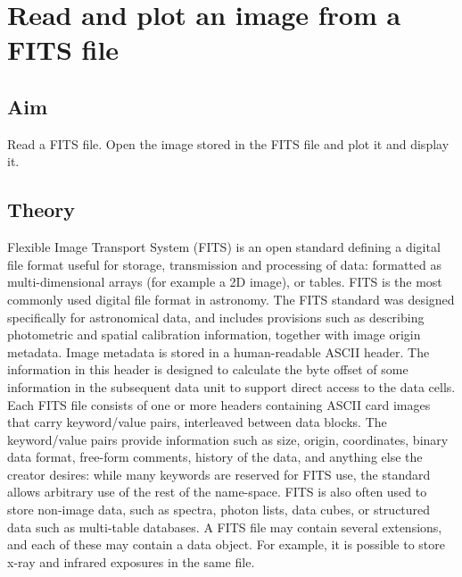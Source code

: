 \documentclass[letterpaper,11pt]{report}
\begin{document}
\chapter{Read and plot an image from a FITS file}

\section{Aim}
Read a FITS file. Open the image stored in the FITS file and plot it and display it.

\section{Theory}
Flexible Image Transport System (FITS) is an open standard defining a digital file format useful for storage, transmission and processing of data: formatted as multi-dimensional arrays (for example a 2D image), or tables. FITS is the most commonly used digital file format in astronomy. The FITS standard was designed specifically for astronomical data, and includes provisions such as describing photometric and spatial calibration information, together with image origin metadata.
Image metadata is stored in a human-readable ASCII header. The information in this header is designed to calculate the byte offset of some information in the subsequent data unit to support direct access to the data cells. Each FITS file consists of one or more headers containing ASCII card images that carry keyword/value pairs, interleaved between data blocks. The keyword/value pairs provide information such as size, origin, coordinates, binary data format, free-form comments, history of the data, and anything else the creator desires: while many keywords are reserved for FITS use, the standard allows arbitrary use of the rest of the name-space.
FITS is also often used to store non-image data, such as spectra, photon lists, data cubes, or structured data such as multi-table databases. A FITS file may contain several extensions, and each of these may contain a data object. For example, it is possible to store x-ray and infrared exposures in the same file.
\end{document}
